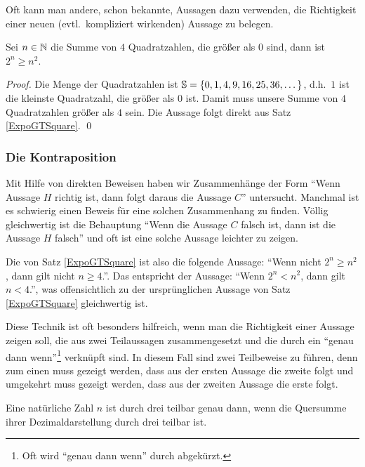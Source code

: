 \bigskip

Oft kann man andere, schon bekannte, Aussagen dazu verwenden, die
Richtigkeit einer neuen (evtl.~kompliziert wirkenden) Aussage zu belegen.

\goodbreak
\begin{theorem}
\label{ExpoGTSquare2}
Sei $n \in \mathbb N$ die Summe von $4$ Quadratzahlen, die größer als $0$
sind, dann ist $2^n \ge n^2$.
\end{theorem}

\begin{proof}
Die Menge der Quadratzahlen ist $\mathbb{S} = \{0, 1, 4, 9, 16, 25, 36,
  \dots\}$, d.h.~$1$ ist die kleinste Quadratzahl, die größer als $0$
ist. Damit muss unsere Summe von $4$ Quadratzahlen größer als $4$
sein. Die Aussage folgt direkt aus Satz \ref{ExpoGTSquare}.
\qed
\end{proof}

\subsubsection{Die Kontraposition}
\label{KontraPos}
Mit Hilfe von direkten Beweisen haben wir Zusammenhänge der Form
"`Wenn Aussage $H$ richtig ist, dann folgt daraus die Aussage $C$"'
untersucht. Manchmal ist es schwierig einen Beweis für eine solchen
Zusammenhang zu finden. Völlig gleichwertig ist die Behauptung "`Wenn
die Aussage $C$ falsch ist, dann ist die Aussage $H$ falsch"' und oft
ist eine solche Aussage leichter zu zeigen.

Die  von 
Satz \ref{ExpoGTSquare} ist also die folgende Aussage: "`Wenn nicht 
$2^n \ge n^2$, dann gilt nicht $n \ge 4$."'. Das entspricht der 
Aussage: "`Wenn $2^n < n^2$, dann gilt $n < 4$."', was offensichtlich 
zu der ursprünglichen Aussage von Satz \ref{ExpoGTSquare} gleichwertig ist.

Diese Technik ist oft besonders hilfreich, wenn man die Richtigkeit
einer Aussage zeigen soll, die aus zwei Teilaussagen zusammengesetzt
und die durch ein "`genau dann wenn"'\footnote{Oft wird "`genau dann
wenn"' durch \emph{\gdw} abgekürzt.} verknüpft sind. In diesem Fall
sind zwei Teilbeweise zu führen, denn zum einen muss gezeigt werden,
dass aus der ersten Aussage die zweite folgt und umgekehrt muss
gezeigt werden, dass aus der zweiten Aussage die erste folgt.

\begin{theorem}
Eine natürliche Zahl $n$ ist durch drei teilbar genau dann, wenn die
Quersumme ihrer Dezimaldarstellung durch drei teilbar ist.
\end{theorem}

